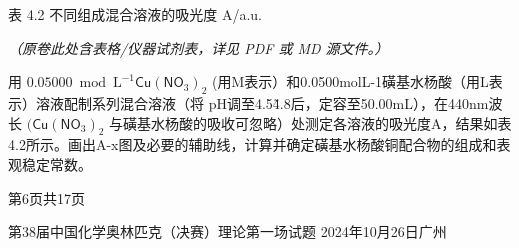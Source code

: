 表 4.2 不同组成混合溶液的吸光度 A/a.u.

\textit{（原卷此处含表格/仪器试剂表，详见 PDF 或 MD 源文件。）}

用 $0 . 0 5 0 0 0 { \bmod { \mathrm { L } } } ^ { - 1 } { \mathsf { C u } } ( { \mathsf { N O } } _ { 3 } ) _ { 2 }$ (用M表示）和0.0500molL-1磺基水杨酸（用L表示）溶液配制系列混合溶液（将 pH调至4.5\~4.8后，定容至50.00mL），在440nm波长 $( \mathsf { C u } ( \mathsf { N O } _ { 3 } ) _ { 2 }$ 与磺基水杨酸的吸收可忽略）处测定各溶液的吸光度A，结果如表4.2所示。画出A-x图及必要的辅助线，计算并确定磺基水杨酸铜配合物的组成和表观稳定常数。

第6页共17页

第38届中国化学奥林匹克（决赛）理论第一场试题 2024年10月26日广州

